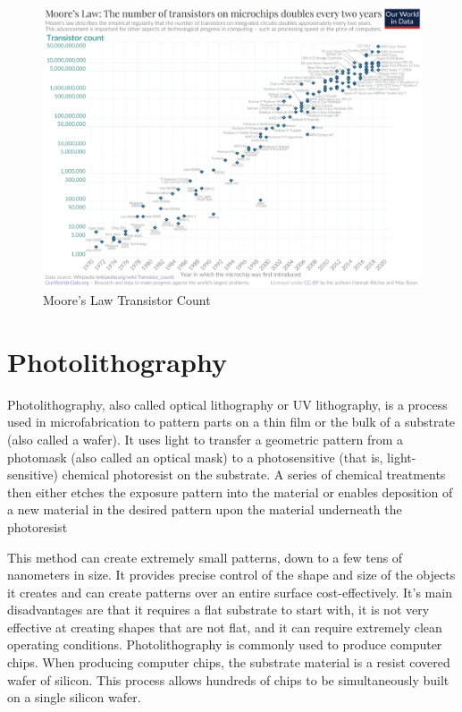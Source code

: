 \documentclass[12pt,a4paper]{report}
\begin{document}
\begin{figure}
  \centering
  \includegraphics[scale=0.3]{Moore's_Law_Transistor_Count.png}
  \caption{Moore's Law Transistor Count}
  \label{arch}
  \end{figure}

\section{Photolithography}
Photolithography, also called optical lithography or UV lithography, 
is a process used in 
microfabrication to pattern parts on a thin film or the bulk of 
a substrate (also called a wafer). 
It uses light to transfer a geometric pattern from a photomask 
(also called an optical mask) to 
a photosensitive (that is, light-sensitive) chemical photoresist 
on the substrate. A series of 
chemical treatments then either etches the exposure pattern into 
the material or enables deposition 
of a new material in the desired pattern upon the material 
underneath the photoresist

This method can create extremely small patterns, down to a few 
tens of nanometers in size. 
It provides precise control of the shape and size of the objects 
it creates and can create 
patterns over an entire surface cost-effectively. It's main 
disadvantages are that it requires 
a flat substrate to start with, it is not very effective at 
creating shapes that are not flat, 
and it can require extremely clean operating conditions. 
Photolithography is commonly used to produce computer chips. 
When producing computer chips, 
the substrate material is a resist covered wafer of silicon. 
This process allows hundreds of 
chips to be simultaneously built on a single silicon wafer.
\end{document}
